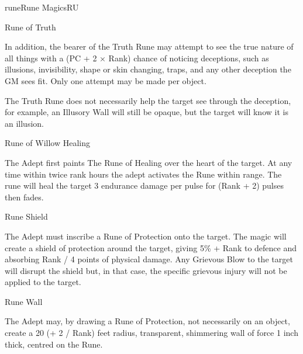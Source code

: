 \begin{College}[2.2]{rune}{Rune Magics}{RU}
\begin{spell}[S-8]{Rune of Truth}
\begin{effects}
In addition, the bearer of the Truth Rune may attempt to see the true
nature of all things with a (PC + 2 × Rank) chance of noticing
deceptions, such as illusions, invisibility, shape or skin changing,
traps, and any other deception the GM sees fit.  Only one attempt may
be made per object.

The Truth Rune does not necessarily help the target see through the
deception, for example, an Illusory Wall will still be opaque, but the
target will know it is an illusion.
\end{effects}
\end{spell}

\begin{spell}[S-9]{Rune of Willow Healing}

\begin{effects}
The Adept first paints The Rune of Healing over the heart of the
target. At any time within twice rank hours the adept activates the
Rune within range. The rune will heal the target 3 endurance damage
per pulse for (Rank + 2) pulses then fades.
\end{effects}
\end{spell}

\begin{spell}[S-10]{Rune Shield}

\begin{effects}
The Adept must inscribe a Rune of Protection onto the target.  The
magic will create a shield of protection around the target, giving 5\%
+ Rank to defence and absorbing Rank / 4 points of physical damage.
Any Grievous Blow to the target will disrupt the shield but, in that
case, the specific grievous injury will not be applied to the target.
\end{effects}
\end{spell}

\begin{spell}[S-11]{Rune Wall}

\begin{effects}
The Adept may, by drawing a Rune of Protection, not necessarily on an
object, create a 20 (+ 2 / Rank) feet radius, transparent, shimmering
wall of force 1 inch thick, centred on the Rune.


\end{effects}
\end{spell}
\end{College}
